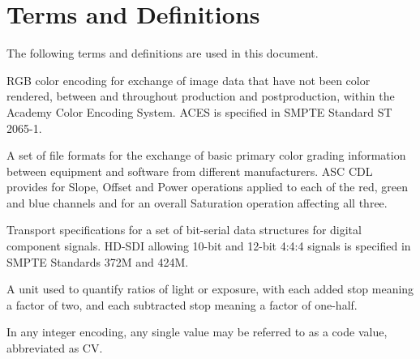 \numberedformat
\chapter{Terms and Definitions}
The following terms and definitions are used in this document.

RGB color encoding for exchange of image data that have not been color rendered, between and throughout production and postproduction, within the Academy Color Encoding System. ACES is specified in SMPTE Standard ST 2065-1.

A set of file formats for the exchange of basic primary color grading information between equipment and software from different manufacturers. ASC CDL provides for Slope, Offset and Power operations applied to each of the red, green and blue channels and for an overall Saturation operation affecting all three.

Transport specifications for a set of bit-serial data structures for digital component signals. HD-SDI allowing 10-bit and 12-bit 4:4:4 signals is specified in SMPTE Standards 372M and 424M.

A unit used to quantify ratios of light or exposure, with each added stop meaning a factor of two, and each subtracted stop meaning a factor of one-half.

In any integer encoding, any single value may be referred to as a code value, abbreviated as CV.
